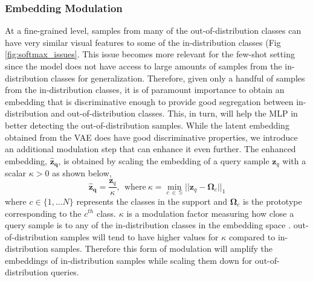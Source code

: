 \subsubsection*{Embedding Modulation} At a fine-grained level, samples from many of the out-of-distribution classes can have very similar visual features to some of the in-distribution classes (Fig \ref{fig:softmax_issues}. This issue becomes more relevant for the few-shot setting since the model does not have access to large amounts of samples from the in-distribution classes for generalization. Therefore, given only a handful of samples from the in-distribution classes, it is of paramount importance to obtain an embedding that is discriminative enough to provide good segregation between in-distribution and out-of-distribution classes. This, in turn, will help the MLP in better detecting the out-of-distribution samples. While the latent embedding obtained from the VAE does have good discriminative properties, we introduce an additional modulation step that can enhance it even further. The enhanced embedding, $\mathbf{\hat{z}_q}$, is obtained by scaling the embedding of a query sample $\mathbf{z}_q$ with a scalar $\kappa > 0$ as shown  below,
\begin{equation}
    \mathbf{\hat{z}_q}=\frac{\mathbf{z}_q}{\kappa}, \ \  \text{where} \ \kappa = \min_{c \ \in \  \mathbb{S}}||\mathbf{z}_q - \mathbf{\Omega}_c||_1
\end{equation}
where $c \in \{1,...N\}$ represents the classes in the support and $\mathbf{\Omega}_c$ is the prototype corresponding to the $c^{th}$ class. $\kappa$ is a modulation factor measuring how close a query sample is to any of the in-distribution classes in the embedding space \cite{Savinov2019_EC}. out-of-distribution samples will tend to have higher values for $\kappa$ compared to in-distribution samples. Therefore this form of modulation will amplify the embeddings of in-distribution samples while scaling them down for out-of-distribution queries.


